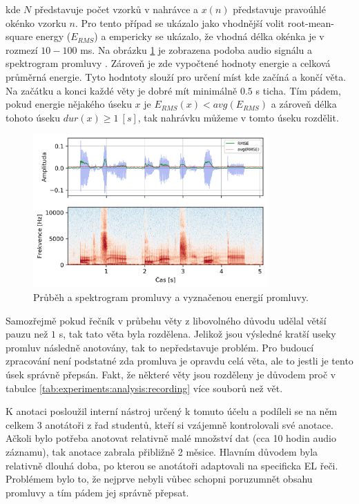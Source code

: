 \noindent kde $N$ představuje počet vzorků v nahrávce a $x(n)$ představuje pravoúhlé okénko vzorku $n$. Pro tento případ se ukázalo jako vhodnější volit root-mean-square energy ($E_{RMS}$) a empericky se ukázalo, že vhodná délka okénka je v rozmezí $10 - 100$ ms. Na obrázku \ref{fig:experiments:analysis:speech} je zobrazena podoba audio signálu a spektrogram promluvy \textit{}. Zároveň je zde vypočtené hodnoty energie a celková průměrná energie. Tyto hodntoty slouží pro určení míst kde začíná a končí věta. Na začátku a konci každé věty je dobré mít minimálně $0.5$ s ticha. Tím pádem, pokud energie nějakého úseku $x$ je $E_{RMS}(x) < avg(E_{RMS})$ a zároveň délka tohoto úseku $dur(x) \geq 1\ [s]$, tak nahrávku můžeme v tomto úseku rozdělit.

\begin{figure}[hbpt]
  \centering
  \includegraphics[width=0.8\textwidth]{./ch4-experiments/img/el_energy_spec.png}
  \caption{Průběh a spektrogram promluvy a vyznačenou energií promluvy.}
  \label{fig:experiments:analysis:speech}
\end{figure}

Samozřejmě pokud řečník v průbehu věty z libovolného důvodu udělal větší pauzu než $1$ s, tak tato věta byla rozdělena. Jelikož jsou výsledné kratší useky promluv následně anotovány, tak to nepředstavuje problém. Pro budoucí zpracování není podstatné zda promluva je opravdu celá věta, ale to jestli je tento úsek správně přepsán. Fakt, že některé věty jsou rozděleny je důvodem proč v tabulce \ref{tab:experiments:analysis:recording} více souborů než vět.

K anotaci posloužil interní nástroj určený k tomuto účelu a podíleli se na něm celkem 3 anotátoři z řad studentů, kteří si vzájemně kontrolovali své anotace. Ačkoli bylo potřeba anotovat relativně malé množství dat (cca 10 hodin audio záznamu), tak anotace zabrala přibližně 2 měsice. Hlavním důvodem byla relativně dlouhá doba, po kterou se anotátoři adaptovali na specificka EL řeči. Problémem bylo to, že nejprve nebyli vůbec schopni poruzumnět obsahu promluvy a tím pádem jej správně přepsat.

